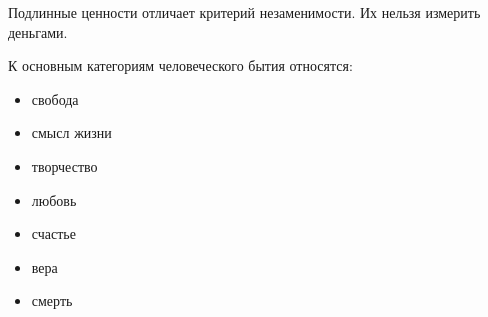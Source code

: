 Подлинные ценности отличает критерий незаменимости. Их нельзя измерить деньгами.

К основным категориям человеческого бытия относятся:
\begin{itemize}
	\item свобода
	\item смысл жизни
	\item творчество  
	\item любовь
	\item счастье 
	\item вера 
	\item смерть
\end{itemize}

